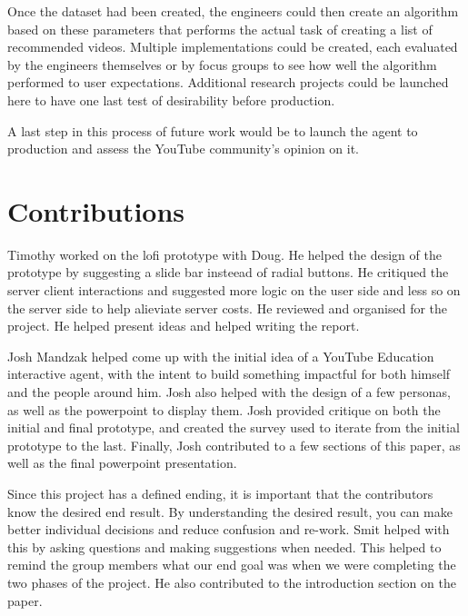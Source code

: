 \documentclass[letterpaper]{article} %
\begin{document}
Once the dataset had been created, the engineers could then create an algorithm based on these parameters that performs the actual task of creating a list of recommended videos. Multiple implementations could be created, each evaluated by the engineers themselves or by focus groups to see how well the algorithm performed to user expectations. Additional research projects could be launched here to have one last test of desirability before production.


A last step in this process of future work would be to launch the agent to production and assess the YouTube community’s opinion on it.


\section{Contributions}

Timothy worked on the lofi prototype with Doug. He helped the design of the prototype by suggesting a slide bar insteead of radial buttons. He critiqued the server client interactions and suggested more logic on the user side and less so on the server side to help alieviate server costs. He reviewed and organised for the project. He helped present ideas and helped writing the report. 

Josh Mandzak helped come up with the initial idea of a YouTube Education interactive agent, with the intent to build something impactful for both himself and the people around him. Josh also helped with the design of a few personas, as well as the powerpoint to display them. Josh provided critique on both the initial and final prototype, and created the survey used to iterate from the initial prototype to the last. Finally, Josh contributed to a few sections of this paper, as well as the final powerpoint presentation.

Since this project has a defined ending, it is important that the contributors know the desired end result. By understanding the desired result, you can make better individual decisions and reduce confusion and re-work. Smit helped with this by asking questions and making suggestions when needed. This helped to remind the group members what our end goal was when we were completing the two phases of the project. He also contributed to the introduction section on the paper.
\end{document}
